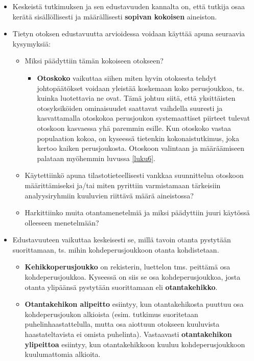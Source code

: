 \documentclass[
]{book}
\providecommand{\tightlist}{%
  \setlength{\itemsep}{0pt}\setlength{\parskip}{0pt}}
\begin{document}
\begin{itemize}
\tightlist
\item
  Keskeistä tutkimuksen ja sen edustavuuden kannalta on, että tutkija osaa kerätä sisällöllisesti ja määrällisesti \textbf{sopivan kokoisen} aineiston.
\item
  Tietyn otoksen edustavuutta arvioidessa voidaan käyttää apuna seuraavia kysymyksiä:

  \begin{itemize}
  \tightlist
  \item
    Miksi päädyttiin tämän kokoiseen otokseen?

    \begin{itemize}
    \tightlist
    \item
      \textbf{Otoskoko} vaikuttaa siihen miten hyvin otoksesta tehdyt johtopäätökset voidaan yleistää koskemaan koko perusjoukkoa, ts. kuinka luotettavia ne ovat. Tämä johtuu siitä, että yksittäisten otosyksiköiden ominaisuudet saattavat vaihdella suuresti ja kasvattamalla otoskokoa perusjoukon systemaattiset piirteet tulevat otoskoon kasvaessa yhä paremmin esille. Kun otoskoko vastaa populaation kokoa, on kyseessä tietenkin kokonaistutkimus, joka kertoo kaiken perusjoukosta. Otoskoon valintaan ja määräämiseen palataan myöhemmin luvussa \ref{luku6}.
    \end{itemize}
  \item
    Käytettiinkö apuna tilastotieteellisesti vankkaa suunnittelua otoskoon määrittämiseksi ja/tai miten pyrittiin varmistamaan tärkeisiin analyysiryhmiin kuuluvien riittävä määrä aineistossa?
  \item
    Harkittiinko muita otantamenetelmiä ja miksi päädyttiin juuri käytössä olleeseen menetelmään?
  \end{itemize}
\item
  Edustavuuteen vaikuttaa keskeisesti se, millä tavoin otanta pystytään suorittamaan, ts. mihin kohdeperusjoukkoon otanta kohdistetaan.

  \begin{itemize}
  \tightlist
  \item
    \textbf{Kehikkoperusjoukko} on rekisterin, luettelon tms. peittämä osa kohdeperusjoukkoa. Kyseessä on siis se osa kohdeperusjoukkoa, josta otanta ylipäänsä pystytään suorittamaan eli \textbf{otantakehikko}.
  \item
    \textbf{Otantakehikon alipeitto} esiintyy, kun otantakehikosta puuttuu osa kohdeperusjoukon alkioista (esim. tutkimus suoritetaan puhelinhaastattelulla, mutta osa aiottuun otokseen kuuluvista haastateltavista ei omista puhelinta). Vastaavasti \textbf{otantakehikon ylipeittoa} esiintyy, kun otantakehikkoon kuuluu kohdeperusjoukkoon kuulumattomia alkioita.


\end{itemize}
\end{itemize}
\end{document}
